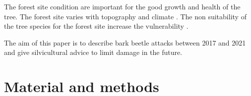 \documentclass[3p,procedia]{elsarticle}
\begin{document}


The forest site condition are important for the good growth and health of the tree.
The forest site varies with topography and climate \citep{brethes_typologie_1989}.
The non suitability of the tree species for the forest site increase the vulnerability \citep{jandl_climate-induced_2020}.

The aim of this paper is to describe bark beetle attacks between 2017 and 2021 and give silvicultural advice to limit damage in the future.  










\section{Material and methods}
\end{document}
